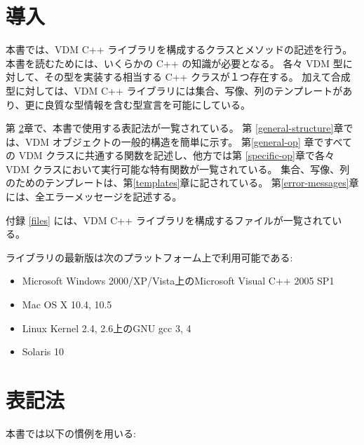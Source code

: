 \documentclass[\pformat,12pt]{jarticle}
\begin{document}

\section{導入}

本書では、VDM C++ ライブラリを構成するクラスとメソッドの記述を行う。
本書を読むためには、いくらかの C++ の知識が必要となる。
各々 VDM 型に対して、その型を実装する相当する C++ クラスが１つ存在する。
加えて合成型に対しては、VDM C++ ライブラリには集合、写像、列のテンプレートがあり、更に良質な型情報を含む型宣言を可能にしている。

第 \ref{conventions}章で、本書で使用する表記法が一覧されている。
第 \ref{general-structure}章では、VDM オブジェクトの一般的構造を簡単に示す。
第\ref{general-op} 章ですべての VDM クラスに共通する関数を記述し、他方では第 \ref{specific-op}章で各々 VDM クラスにおいて実行可能な特有関数が一覧されている。 
集合、写像、列のためのテンプレートは、第\ref{templates}章に記されている。
第\ref{error-messages}章には、全エラーメッセージを記述する。

付録 \ref{files} には、VDM C++ ライブラリを構成するファイルが一覧されている。

ライブラリの最新版は次のプラットフォーム上で利用可能である:
\begin{itemize}
\item Microsoft Windows 2000/XP/Vista上のMicrosoft Visual C++ 2005 SP1
\item Mac OS X 10.4, 10.5
\item Linux Kernel 2.4, 2.6上のGNU gcc 3, 4
\item Solaris 10
\end{itemize}


\section{表記法} 
\label{conventions}
本書では以下の慣例を用いる:

\vspace{0.5cm}
\end{document}
